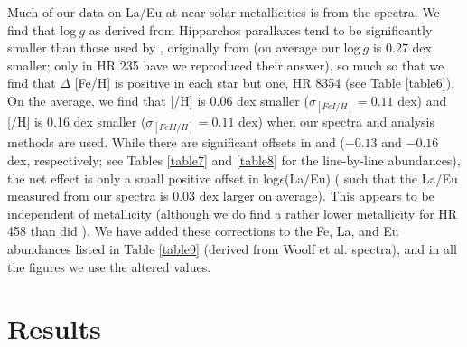 \documentclass[12pt,preprint]{aastex}
\begin{document}
{Much of our data on La/Eu at near-solar metallicities is from the \citet{Woolf1995} spectra.  We find that log$~g$ as derived from Hipparchos parallaxes tend to be significantly smaller than those used by \citet{Woolf1995}, originally from \citet{Edvardsson1993} (on average our log$~g$ is 0.27 dex smaller; only in HR 235 have we reproduced their answer), so much so that we find that $\Delta$ [Fe/H] is positive in each star but one, HR 8354 (see Table \ref{table6}).   On the average, we find that [/H] is 0.06 dex smaller ($\sigma_{[Fe I/H]}=0.11$ dex) and [/H] is 0.16 dex smaller ($\sigma_{[Fe II/H]}= 0.11$ dex) when our spectra and analysis methods are used.  While there are significant offsets in  and  ($-0.13$ and $-0.16$ dex, respectively; see Tables \ref{table7} and \ref{table8} for the line-by-line abundances),  the net effect is only a small positive offset in log$\epsilon$(La/Eu) ( such that the La/Eu measured from our spectra  is 0.03 dex larger on average).  This appears to be independent of metallicity (although we do find a rather lower metallicity for HR 458 than did \citealt{Woolf1995}).  We  have added these corrections to the Fe, La, and Eu abundances listed in Table \ref{table9} (derived from Woolf et al. spectra), and in all the figures we use the altered values.

\section{Results \label{disc}}

}
\end{document}
